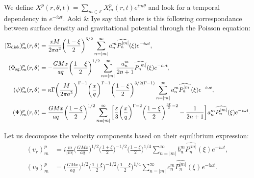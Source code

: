 \documentclass[11pt]{article}
\newcommand{\vr}{v_{r}}
\newcommand{\vt}{v_{\theta}}
\newcommand{\Sigmad}{\Sigma_{\rm{disk}}}
\newcommand{\Phisg}{\Phi_{\rm{sg}}}
\newcommand{\anm}{a_n^m}
\newcommand{\bnm}{b_n^m}
\newcommand{\cnm}{c_n^m}
\newcommand{\Pnm}{P_n^{|m|}}
\newcommand{\hPnm}{\widehat{\Pnm}}
\begin{document}
We define $X^p(r,\theta,t) = \sum_{m\in \mathbb{Z}} X_m^p(r,t) e^{i m \theta}$ and look for a temporal dependency in $e^{-i \omega t}$.
Aoki \& Iye say that there is this following correspondance between surface density and gravitational potential through the Poisson equation:
\begin{align}
(\Sigmad)_m^p (r,\theta) &= \frac{xM}{2\pi a^2} \bigg(\frac{1-\xi}{2}\bigg)^{3/2} \sum_{n=|m|}^{\infty} \anm \hPnm(\xi) e^{-i \omega t} ,\\
(\Phisg)_m^p (r,\theta) &= -\frac{GMx}{a q} \bigg(\frac{1-\xi}{2}\bigg)^{1/2} \sum_{n=|m|}^{\infty} \frac{\anm}{2n+1} \hPnm(\xi) e^{-i \omega t} ,\\
(\psi)_m^p (r,\theta) &= \kappa \Gamma \bigg(\frac{M}{2\pi a^2} \bigg)^{\Gamma-1} \bigg(\frac{x}{q}\bigg)^{\Gamma-1} \bigg(\frac{1-\xi}{2}\bigg)^{3/2(\Gamma-1)} \sum_{n=|m|}^{\infty} \anm \hPnm(\xi) e^{-i \omega t} ,\\
(\Psi)_m^p (r,\theta) &= \frac{GMx}{a q } \bigg(\frac{1-\xi}{2}\bigg)^{1/2}\sum_{n=|m|}^{\infty} \bigg[\frac{\varepsilon}{3}  \bigg(\frac{x}{q}\bigg)^{\Gamma-2} \bigg(\frac{1-\xi}{2}\bigg)^{\frac{3\Gamma}{2}-2}  -\frac{1}{2n+1}  \bigg]\anm \hPnm(\xi)e^{-i \omega t} .
\end{align}

Let us decompose the velocity components based on their equilibrium expression:
\begin{align}
(\vr)_m^p &= i \frac{m}{|m|} \bigg(\frac{GMx}{aq}\bigg)^{1/2} \bigg(\frac{1+\xi}{2}\bigg)^{-1/2} \bigg(\frac{1-\xi}{2}\bigg)^{1/4} \sum_{n=|m|}^{\infty} \bnm \hPnm(\xi) e^{-i \omega t} ,\\
(\vt)_m^p &=\bigg(\frac{GMx}{aq}\bigg)^{1/2} \bigg(\frac{1+\xi}{2}\bigg)^{-1/2} \bigg(\frac{1-\xi}{2}\bigg)^{1/4} \sum_{n=|m|}^{\infty} \cnm \hPnm(\xi) e^{-i \omega t} .
\end{align}
\end{document}

